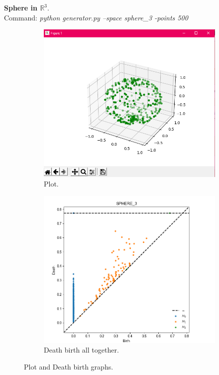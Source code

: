 \documentclass[11pt,a4paper]{report}
\begin{document}
            \textbf{Sphere in $\mathbb{R}^3$}.\\
              Command: \textit{python generator.py --space sphere\_3 -points 500}

              \begin{figure}[H]
                \centering
                \begin{subfigure}[b]{0.45\linewidth}
                  \includegraphics[width=\linewidth]{./ripser/on_sphere.PNG}
                  \caption{Plot.}
                \end{subfigure}
                \begin{subfigure}[b]{0.45\linewidth}
                  \includegraphics[width=\linewidth]{./ripser/on_sphere_homology.PNG}
                  \caption{Death birth all together.}
                \end{subfigure}
                \caption{Plot and Death birth graphs.}
                \label{fig: plot death}
              \end{figure}
\end{document}
